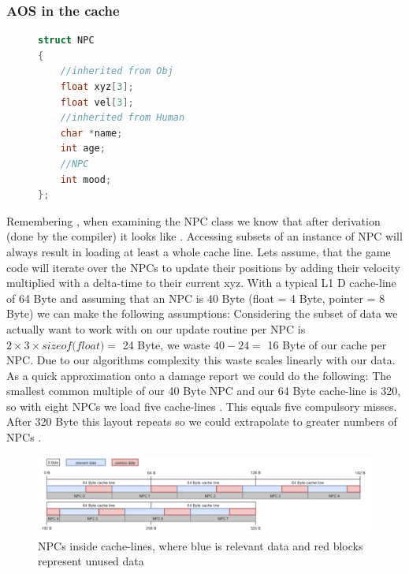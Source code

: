 \subsubsection{AOS in the cache}
\begin{figure}
\vspace{-0.6cm}
\begin{lstlisting}[language=C++,numbers=none,name={NPC pod after derivation is done},label={post_deriv_npc}]
struct NPC 
{
	//inherited from Obj 
	float xyz[3];
	float vel[3];
	//inherited from Human
	char *name;
	int age;
	//NPC
	int mood;
};
\end{lstlisting}
\end{figure}
Remembering , when examining the NPC class we know that after derivation (done by the compiler) it looks like . Accessing subsets of an instance of NPC will always result in loading at least a whole cache line. Lets assume, that the game code will iterate over the NPCs to update their positions by adding their velocity multiplied with a delta-time to their current xyz. With a typical L1 D cache-line of 64 Byte and assuming that an NPC is 40 Byte (float = 4 Byte, pointer = 8 Byte) we can make the following assumptions: Considering the subset of data we actually want to work with on our update routine per NPC is $2\times 3\times \textit{sizeof(float)} = $ 24 Byte, we waste $40 - 24 =$ 16 Byte of our cache per NPC. Due to our algorithms complexity  this waste scales linearly with our data.\\
As a quick approximation onto a damage report we could do the following:
The smallest common multiple of our 40 Byte NPC and our 64 Byte cache-line is 320, so with eight NPCs we load five cache-lines . This equals five compulsory misses. After 320 Byte this layout repeats so we could extrapolate to greater numbers of NPCs . 
\begin{figure}[!htbp]
	\centering
	\includegraphics[width=1.0\linewidth, height=0.3\linewidth]{PICs/CacheUtilizationNPC}
	\caption{NPCs inside cache-lines, where blue is relevant data and red blocks represent unused data}\label{cache_utilization_npc}
\end{figure}
